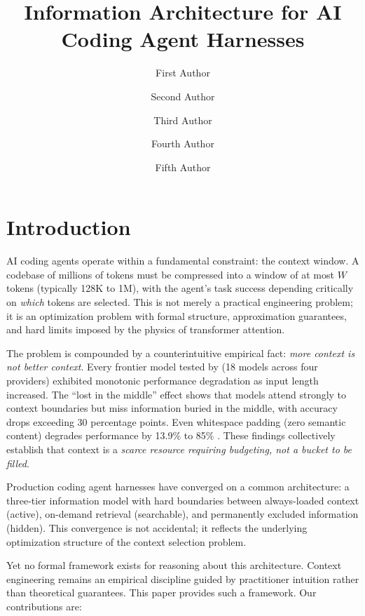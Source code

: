 \documentclass[11pt, a4paper, logo, copyright]{googledeepmind}
\title{Information Architecture for AI Coding Agent Harnesses}
\author[1]{First Author}
\author[2]{Second Author}
\author[2]{Third Author}
\author[1]{Fourth Author}
\author[1]{Fifth Author}
\affil[]{Pragnition Labs}
\affil[*]{Equal Contribution}
\affil[1]{Affiliation 1}
\affil[2]{Affiliation 2}
\begin{document}
\maketitle

\section{Introduction}
\label{sec:introduction}

AI coding agents operate within a fundamental constraint: the context window. A codebase of millions of tokens must be compressed into a window of at most $W$ tokens (typically 128K to 1M), with the agent's task success depending critically on \emph{which} tokens are selected. This is not merely a practical engineering problem; it is an optimization problem with formal structure, approximation guarantees, and hard limits imposed by the physics of transformer attention.

The problem is compounded by a counterintuitive empirical fact: \emph{more context is not better context}. Every frontier model tested by \citet{chroma2025contextrot} (18 models across four providers) exhibited monotonic performance degradation as input length increased. The ``lost in the middle'' effect \citep{liu2024lost} shows that models attend strongly to context boundaries but miss information buried in the middle, with accuracy drops exceeding 30 percentage points. Even whitespace padding (zero semantic content) degrades performance by 13.9\% to 85\% \citep{du2025context}. These findings collectively establish that context is a \emph{scarce resource requiring budgeting, not a bucket to be filled}.

Production coding agent harnesses have converged on a common architecture: a three-tier information model with hard boundaries between always-loaded context (active), on-demand retrieval (searchable), and permanently excluded information (hidden). This convergence is not accidental; it reflects the underlying optimization structure of the context selection problem.

Yet no formal framework exists for reasoning about this architecture. Context engineering remains an empirical discipline guided by practitioner intuition rather than theoretical guarantees. This paper provides such a framework. Our contributions are:
\end{document}
